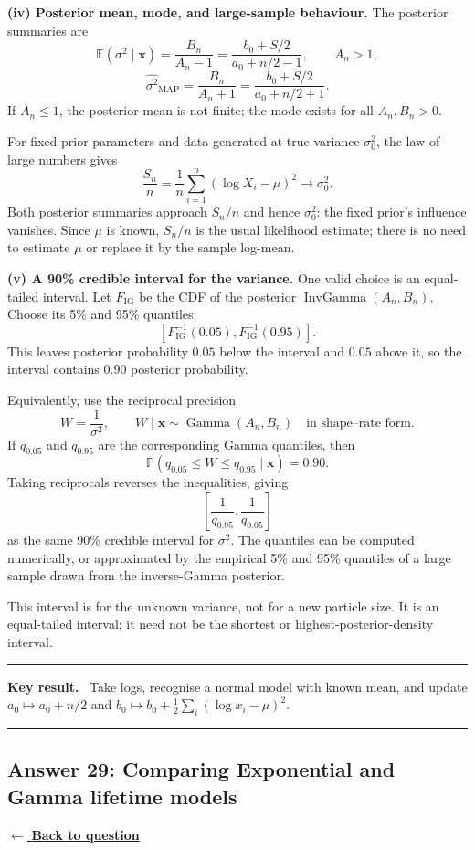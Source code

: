 \documentclass[11pt,a4paper]{article}
\newcommand{\xvec}{\boldsymbol{x}}
\DeclareMathOperator{\InvGamma}{InvGamma}
\newcommand{\E}{\mathbb{E}}
\newcommand{\answernav}[1]{%
  \label{answer:#1}%
  \noindent\hyperref[question:#1]{$\leftarrow$ \textbf{Back to question}}%
  \par\smallskip}
\newenvironment{keyresult}
  {\begin{center}\begin{minipage}{0.92\linewidth}\color{statblue}%
   \hrule\vspace{6pt}\textbf{Key result.}\ }
  {\vspace{6pt}\hrule\end{minipage}\end{center}}
\begin{document}
\textbf{(iv) Posterior mean, mode, and large-sample behaviour.}
The posterior summaries are
\[
\boxed{\E(\sigma^2\mid\xvec)=\frac{B_n}{A_n-1}
=\frac{b_0+S/2}{a_0+n/2-1},\qquad A_n>1,}
\]
\[
\boxed{\widehat{\sigma^2}_{\mathrm{MAP}}=\frac{B_n}{A_n+1}
=\frac{b_0+S/2}{a_0+n/2+1}.}
\]
If $A_n\leq1$, the posterior mean is not finite; the mode exists for all
$A_n,B_n>0$.

For fixed prior parameters and data generated at true variance
$\sigma_0^2$, the law of large numbers gives
\[
\frac{S_n}{n}=\frac1n\sum_{i=1}^{n}(\log X_i-\mu)^2
\longrightarrow\sigma_0^2.
\]
Both posterior summaries approach $S_n/n$ and hence $\sigma_0^2$:
the fixed prior's influence vanishes. Since $\mu$ is known, $S_n/n$ is
the usual likelihood estimate; there is no need to estimate $\mu$ or
replace it by the sample log-mean.

\textbf{(v) A 90\% credible interval for the variance.}
One valid choice is an equal-tailed interval. Let $F_{\mathrm{IG}}$ be
the CDF of the posterior $\InvGamma(A_n,B_n)$. Choose its 5\% and 95\%
quantiles:
\[
\boxed{\left[F_{\mathrm{IG}}^{-1}(0.05),
F_{\mathrm{IG}}^{-1}(0.95)\right].}
\]
This leaves posterior probability $0.05$ below the interval and $0.05$
above it, so the interval contains $0.90$ posterior probability.

Equivalently, use the reciprocal precision
\[
W=\frac1{\sigma^2},\qquad
W\mid\xvec\sim\operatorname{Gamma}(A_n,B_n)
\quad\text{in shape--rate form}.
\]
If $q_{0.05}$ and $q_{0.95}$ are the corresponding Gamma quantiles, then
\[
\mathbb{P}(q_{0.05}\leq W\leq q_{0.95}\mid\xvec)=0.90.
\]
Taking reciprocals reverses the inequalities, giving
\[
\boxed{\left[\frac1{q_{0.95}},\frac1{q_{0.05}}\right]}
\]
as the same 90\% credible interval for $\sigma^2$. The quantiles can be
computed numerically, or approximated by the empirical 5\% and 95\%
quantiles of a large sample drawn from the inverse-Gamma posterior.

This interval is for the unknown variance, not for a new particle size.
It is an equal-tailed interval; it need not be the shortest or
highest-posterior-density interval.

\begin{keyresult}
Take logs, recognise a normal model with known mean, and update
$a_0\mapsto a_0+n/2$ and
$b_0\mapsto b_0+\tfrac12\sum_i(\log x_i-\mu)^2$.
\end{keyresult}

\clearpage

\subsection{Answer 29: Comparing Exponential and Gamma lifetime models}
\answernav{29}
\end{document}

